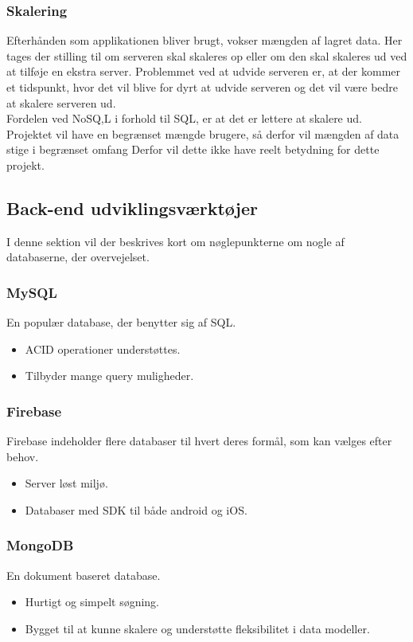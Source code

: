 \subsubsection{Skalering}
Efterhånden som applikationen bliver brugt, vokser mængden af lagret data. Her tages der stilling til om serveren skal skaleres op eller om den skal skaleres ud ved at tilføje en ekstra server. Problemmet ved at udvide serveren er, at der kommer et tidspunkt, hvor det vil blive for dyrt at udvide serveren og det vil være bedre at skalere serveren ud. \\
Fordelen ved NoSQ,L i forhold til SQL, er at det er lettere at skalere ud. 
Projektet vil have en begrænset mængde brugere, så derfor vil mængden af data stige i begrænset omfang
Derfor vil dette ikke have reelt betydning for dette projekt.

\subsection{Back-end udviklingsværktøjer}
I denne sektion vil der beskrives kort om nøglepunkterne om nogle af databaserne, der overvejelset. 

\subsubsection{MySQL\cite{MySQL}}
En populær database, der benytter sig af SQL.
\begin{itemize}[-]
	\item ACID\cite{ACID} operationer understøttes.
	\item Tilbyder mange query muligheder.
\end{itemize}

\subsubsection{Firebase\cite{Firebase}}
Firebase indeholder flere databaser til hvert deres formål, som kan vælges efter behov. 
\begin{itemize}[-]
	\item Server løst miljø.
	\item Databaser med SDK til både android og iOS.
\end{itemize}

\subsubsection{MongoDB\cite{mongoDB}}
En dokument baseret database.
\begin{itemize}[-]
	\item Hurtigt og simpelt søgning.
	\item Bygget til at kunne skalere og understøtte fleksibilitet i data modeller.  \\
	
\end{itemize}

